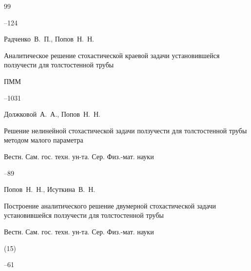\begin{thebibliography}{99}



--124





\by Радченко~В.~П., Попов~Н.~Н.

\paper Аналитическое решение стохастической краевой задачи установившейся ползучести для толстостенной трубы

\jour ПММ




--1031





\by Должковой~А.~А., Попов~Н.~Н.

\paper Решение нелинейной стохастической задачи ползучести для толстостенной трубы методом малого параметра

\jour Вестн. Сам. гос. техн. ун-та. Сер. Физ.-мат. науки



--89






\by Попов~Н.~Н., Исуткина~В.~Н.

\paper Построение аналитического решение двумерной стохастической задачи установившейся ползучести для толстостенной трубы

\jour Вестн. Сам. гос. техн. ун-та. Сер. Физ.-мат. науки


(15)

--61









\end{thebibliography}
